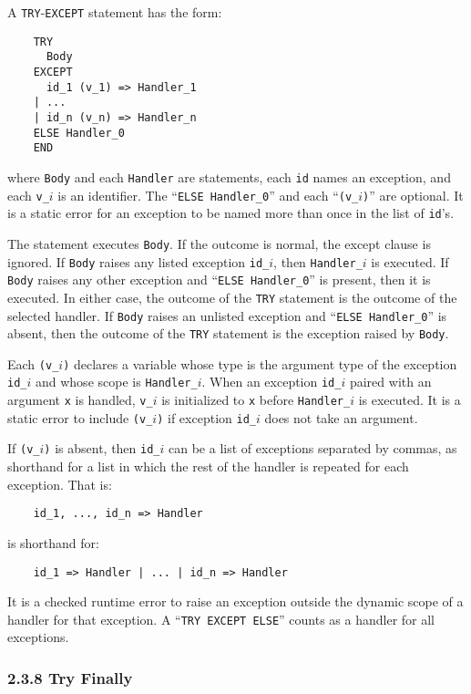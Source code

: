 \documentclass[10pt]{article}
\begin{document}
A \verb|TRY|-\verb|EXCEPT| statement has the form:
\begin{verbatim}
    TRY
      Body
    EXCEPT
      id_1 (v_1) => Handler_1
    | ...
    | id_n (v_n) => Handler_n
    ELSE Handler_0
    END
\end{verbatim}
where \verb|Body| and each \verb|Handler| are statements, each \verb|id| names
an exception, and each \verb|v_|$i$ is an identifier.  The
``\verb|ELSE Handler_0|'' and each ``\verb|(v_|$i$\verb|)|'' are optional.
It is a static error for an exception to be named more than once in the list
of \verb|id|'s.

The statement executes \verb|Body|.  If the outcome is normal, the except
clause is ignored.  If \verb|Body| raises any listed exception \verb|id_|$i$,
then \verb|Handler_|$i$ is executed.  If \verb|Body| raises any other
exception and ``\verb|ELSE Handler_0|'' is present, then it is executed.  In
either case, the outcome of the \verb|TRY| statement is the outcome of the
selected handler.  If \verb|Body| raises an unlisted exception and
``\verb|ELSE Handler_0|'' is absent, then the outcome of the \verb|TRY|
statement is the exception raised by \verb|Body|.

Each \verb|(v_|$i$\verb|)| declares a variable whose type is the argument type
of the exception \verb|id_|$i$ and whose scope is \verb|Handler_|$i$.  When an
exception \verb|id_|$i$ paired with an argument \verb|x| is handled,
\verb|v_|$i$ is initialized to \verb|x| before \verb|Handler_|$i$ is executed.
It is a static error to include \verb|(v_|$i$\verb|)| if exception
\verb|id_|$i$ does not take an argument.

If \verb|(v_|$i$\verb|)| is absent, then \verb|id_|$i$ can be a list of
exceptions separated by commas, as shorthand for a list in which the rest of
the handler is repeated for each exception.  That is:
\begin{verbatim}
    id_1, ..., id_n => Handler
\end{verbatim}
is shorthand for:
\begin{verbatim}
    id_1 => Handler | ... | id_n => Handler
\end{verbatim}

It is a checked runtime error to raise an exception outside the dynamic scope
of a handler for that exception.  A ``\verb|TRY EXCEPT ELSE|'' counts as a
handler for all exceptions.

\subsubsection*{2.3.8 Try Finally}
\end{document}
